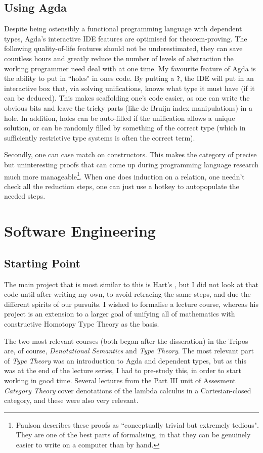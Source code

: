 \documentclass[12pt,a4paper,twoside,openright]{report}
\begin{document}
\subsection{Using Agda}
Despite being ostensibly a functional programming language with dependent types, Agda's interactive IDE features are optimised for theorem-proving. The following quality-of-life features should not be underestimated, they can save countless hours and greatly reduce the number of levels of abstraction the working programmer need deal with at one time. My favourite feature of Agda is the ability to put in ``holes" in ones code. By putting a \texttt{?}, the IDE will put in an interactive box that, via solving unifications, knows what type it must have (if it can be deduced). This makes scaffolding one's code easier, as one can write the obvious bits and leave the tricky parts (like de Bruijn index manipulations) in a hole. In addition, holes can be auto-filled if the unification allows a unique solution, or can be randomly filled by something of the correct type (which in sufficiently restrictive type systems is often the correct term). 

Secondly, one can case match on constructors. This makes the category of precise but uninteresting proofs that can come up during programming language research much more manageable\footnote{Paulson \cite{Larry} describes these proofs as ``conceptually trivial but extremely tedious". They are one of the best parts of formalising, in that they can be genuinely easier to write on a computer than by hand.}. When one does induction on a relation, one needn't check all the reduction steps, one can just use a hotkey to autopopulate the needed steps. 
\section{Software Engineering}
\subsection{Starting Point}
The main project that is most similar to this is Hart's \cite{Hart}, but I did not look at that code until after writing my own, to avoid retracing the same steps, and due the different spirits of our pursuits. I wished to formalise a lecture course, whereas his project is an extension to a larger goal of unifying all of mathematics with constructive Homotopy Type Theory as the basis.

The two most relevant courses (both began after the disseration) in the Tripos are, of course, \textit{Denotational Semantics} and \textit{Type Theory}. The most relevant part of \textit{Type Theory} was an introduction to Agda and dependent types, but as this was at the end of the lecture series, I had to pre-study this, in order to start working in good time. Several lectures from the Part III unit of Assesment \textit{Category Theory} cover denotations of the lambda calculus in a Cartesian-closed category, and these were also very relevant. 
\end{document}
